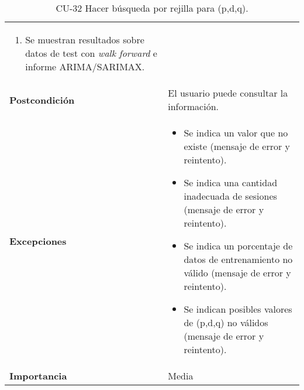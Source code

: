 \begin{table}[p]
\begin{tabularx}{\linewidth}{ p{} p{} }
\begin{enumerate}
			\item Se muestran resultados sobre datos de test con \emph{walk forward} e informe ARIMA/SARIMAX.
		\end{enumerate}\\
		\textbf{Postcondición}        & El usuario puede consultar la información. \\
		\textbf{Excepciones}          & 
		\begin{itemize}
			\tightlist
			\item Se indica un valor que no existe (mensaje de error y reintento).
			\item Se indica una cantidad inadecuada de sesiones (mensaje de error y reintento).
			\item Se indica un porcentaje de datos de entrenamiento no válido (mensaje de error y reintento).
			\item Se indican posibles valores de (p,d,q) no válidos (mensaje de error y reintento).
		\end{itemize} \\
		\textbf{Importancia}          & Media \\
		\bottomrule
	\end{tabularx}
	\caption{CU-32 Hacer búsqueda por rejilla para (p,d,q).}
\end{table}


